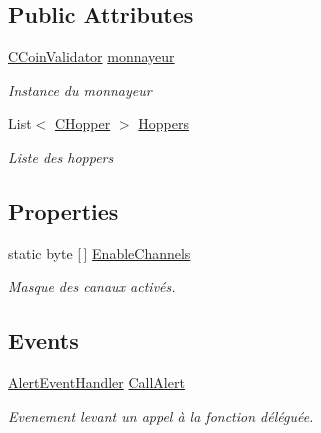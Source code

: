 \subsection*{Public Attributes}
\begin{DoxyCompactItemize}
\item 
\mbox{\hyperlink{class_device_library_1_1_c_coin_validator}{C\+Coin\+Validator}} \mbox{\hyperlink{class_device_library_1_1_c_devices_manage_a0a0fd3a37a1a8c01b2227b3cd0029b11}{monnayeur}}
\begin{DoxyCompactList}\small\item\em Instance du monnayeur \end{DoxyCompactList}\item 
List$<$ \mbox{\hyperlink{class_device_library_1_1_c_hopper}{C\+Hopper}} $>$ \mbox{\hyperlink{class_device_library_1_1_c_devices_manage_ae9d4323b152f0a1767c004668d2ab3ea}{Hoppers}}
\begin{DoxyCompactList}\small\item\em Liste des hoppers \end{DoxyCompactList}\end{DoxyCompactItemize}
\subsection*{Properties}
\begin{DoxyCompactItemize}
\item 
static byte \mbox{[}$\,$\mbox{]} \mbox{\hyperlink{class_device_library_1_1_c_devices_manage_a881da4fa7a164664f6342669ca532b7b}{Enable\+Channels}}
\begin{DoxyCompactList}\small\item\em Masque des canaux activés. \end{DoxyCompactList}\end{DoxyCompactItemize}
\subsection*{Events}
\begin{DoxyCompactItemize}
\item 
\mbox{\hyperlink{class_device_library_1_1_c_devices_manage_a76f84b8a18500338f67d33123aa3332a}{Alert\+Event\+Handler}} \mbox{\hyperlink{class_device_library_1_1_c_devices_manage_a6813f81d6f606f0aa66fb6613af6bbe8}{Call\+Alert}}
\begin{DoxyCompactList}\small\item\em Evenement levant un appel à la fonction déléguée. \end{DoxyCompactList}\end{DoxyCompactItemize}


